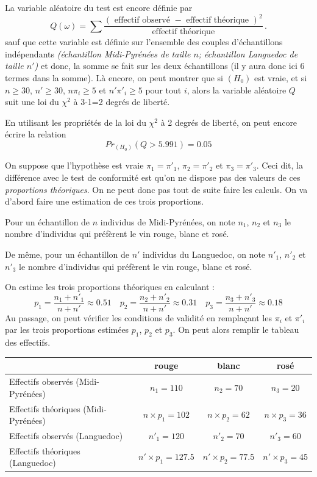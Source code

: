 \documentclass[12pt, a4paper]{book}
\numberwithin{equation}{section}
\begin{document}
La variable aléatoire du test est encore définie par 
$$
Q(\omega)=\sum\frac{ ({\mbox { effectif observé }} -  {\mbox { effectif théorique }})^2}
 { {\mbox { effectif théorique }}} \,.
$$
sauf que cette variable est définie sur l'ensemble des couples d'échantillons indépendants
{\it (échantillon Midi-Pyrénées de taille $n$; échantillon Languedoc de taille $n'$)} et donc, 
la somme se fait sur les deux échantillons (il y aura donc ici 6 termes dans la somme).
Là encore, on peut montrer que si $(H_0)$ est vraie, et si $n\geq 30$, $n'\geq 30$, $n\pi_i \geq 5$ et $n'\pi'_i \geq 5$ pour tout 
$i$, alors la variable aléatoire $Q$ suit une loi du $\chi^2$ à 3-1=2 degrés de liberté.

En utilisant les propriétés de la loi du $\chi^2$ à 2 degrés de liberté, on peut encore écrire la relation
$$
Pr_{(H_0)}(Q > 5.991) = 0.05
$$

On suppose que l'hypothèse est vraie $\pi_1=\pi'_1$, $\pi_2=\pi'_2$ et $\pi_3=\pi'_3$. 
Ceci dit, la différence avec le test de conformité est qu'on ne dispose 
pas des valeurs de ces {\it proportions théoriques}. On ne peut donc pas tout de suite faire les calculs.
On va d'abord faire une estimation de ces trois proportions.

Pour un échantillon de $n$ individus de Midi-Pyrénées, on note $n_1$, $n_2$ et $n_3$ le nombre d'individus
qui préfèrent le vin rouge, blanc et rosé.

De même,  pour un échantillon de $n'$ individus du Languedoc, on note $n'_1$, $n'_2$ et $n'_3$ le nombre 
d'individus qui préfèrent le vin rouge, blanc et rosé.

On estime les trois proportions théoriques en calculant :
$$
p_1 = \frac{n_1+n'_1}{n+n'}\approx 0.51 \quad p_2 = \frac{n_2+n'_2}{n+n'}\approx 0.31 \quad 
p_3 = \frac{n_3+n'_3}{n+n'}\approx 0.18
$$
Au passage, on peut vérifier les conditions de validité en remplaçant les $\pi_i$ et $\pi'_i$ par les trois
proportions estimées $p_1$, $p_2$ et $p_3$.
On peut alors remplir le tableau des effectifs. \\

\begin{tabular}{|l|c|c|c|}
\hline
        & rouge & blanc & rosé \\
\hline
Effectifs observés (Midi-Pyrénées) & $n_1=110$ & $n_2=70$ & $n_3=20$ \\
\hline
Effectifs théoriques (Midi-Pyrénées) & $n\times p_1=102 $ & $n\times p_2=62 $ 
 & $n\times p_3=36 $ \\
\hline
Effectifs observés (Languedoc) & $n'_1=120$ & $n'_2=70$ & $n'_3=60$ \\
\hline
Effectifs théoriques (Languedoc) & $n'\times p_1= 127.5$ & $n'\times p_2=77.5 $ 
& $n'\times p_3 = 45$ \\
\hline
\end{tabular}
\\
\end{document}
